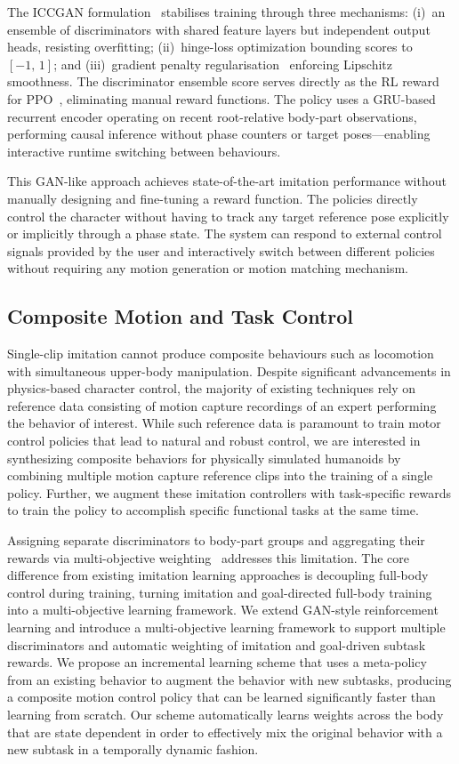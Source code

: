 The ICCGAN formulation~\cite{iccgan2021} stabilises training through three mechanisms: (i)~an ensemble of discriminators with shared feature layers but independent output heads, resisting overfitting; (ii)~hinge-loss optimization bounding scores to $[-1,\,1]$; and (iii)~gradient penalty regularisation~\cite{wgangp2017} enforcing Lipschitz smoothness. The discriminator ensemble score serves directly as the RL reward for PPO~\cite{ppo2017}, eliminating manual reward functions. The policy uses a GRU-based recurrent encoder operating on recent root-relative body-part observations, performing causal inference without phase counters or target poses---enabling interactive runtime switching between behaviours.

This GAN-like approach achieves state-of-the-art imitation performance without manually designing and fine-tuning a reward function. The policies directly control the character without having to track any target reference pose explicitly or implicitly through a phase state. The system can respond to external control signals provided by the user and interactively switch between different policies without requiring any motion generation or motion matching mechanism.

\subsection{Composite Motion and Task Control}

Single-clip imitation cannot produce composite behaviours such as locomotion with simultaneous upper-body manipulation. Despite significant advancements in physics-based character control, the majority of existing techniques rely on reference data consisting of motion capture recordings of an expert performing the behavior of interest. While such reference data is paramount to train motor control policies that lead to natural and robust control, we are interested in synthesizing composite behaviors for physically simulated humanoids by combining multiple motion capture reference clips into the training of a single policy. Further, we augment these imitation controllers with task-specific rewards to train the policy to accomplish specific functional tasks at the same time.

Assigning separate discriminators to body-part groups and aggregating their rewards via multi-objective weighting~\cite{composite2023} addresses this limitation. The core difference from existing imitation learning approaches is decoupling full-body control during training, turning imitation and goal-directed full-body training into a multi-objective learning framework. We extend GAN-style reinforcement learning and introduce a multi-objective learning framework to support multiple discriminators and automatic weighting of imitation and goal-driven subtask rewards. We propose an incremental learning scheme that uses a meta-policy from an existing behavior to augment the behavior with new subtasks, producing a composite motion control policy that can be learned significantly faster than learning from scratch. Our scheme automatically learns weights across the body that are state dependent in order to effectively mix the original behavior with a new subtask in a temporally dynamic fashion.

